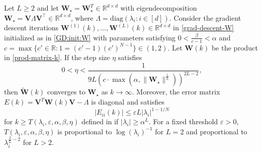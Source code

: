 \documentclass{svproc}
\newcommand{\bV}{\boldsymbol{V}}
\newcommand{\bW}{\boldsymbol{W}}
\newcommand{\0}{\boldsymbol{0}}
\newcommand{\1}{\boldsymbol{1}}
\renewcommand{\tilde}{\widetilde}
\renewcommand{\epsilon}{\varepsilon}
\def\R{\mathbb{R}}
\def\Lln{\mathcal{L}_\text{ln}}
\def\Wstar{\bW_\star}
\def\tdisc{{k}}
\def\bWprod{\tilde{\bW}}
\newcommand{\diag}{\mathrm{diag}}
\begin{document}
\begin{theorem}\label{theorem:PerturbedInitialization_NonAsymptoticConvergence}
Let $L\geq 2$ and let $\Wstar= \Wstar^T \in \R^{d \times d}$ with eigendecomposition $\Wstar = \bV\Lambda \bV^\top \in \mathbb{R}^{d \times d}$, %
where $\Lambda = \diag(\lambda_i : i \in [d])$. Consider the gradient descent iterations $\bW^{(1)}(\tdisc), \hdots, \bW^{(L)}(\tdisc) \in \mathbb{R}^{d\times d}$ in \eqref{grad-descent-W} 
initialized as in \eqref{GD:init:W} with 
parameters satisfying $0 < \frac{\beta}{c-1} < \alpha $ and $c=\max\{c'\in\mathbb{R}:1=(c'-1)(c')^{N-1}\}\in(1,2)$. Let $\bW(\tdisc)$ be the product in \eqref{prod-matrix-k}.
If the step size $\eta$ satisfies
\begin{equation}\label{cond:stepsize:thm}
    0 < \eta < 
    \frac{1}{9L (c\cdot\max(\alpha,\|\Wstar\|^{\frac{1}{L}}))^{2L-2}},
\end{equation}
then $\bWprod(\tdisc)$ converges to $\Wstar$ as $\tdisc \to \infty$. Moreover, the error matrix $E(\tdisc) = \bV^T \bW(\tdisc) \bV - \Lambda$ is diagonal and satisfies
\[
|E_{ii}(\tdisc)| \leq \varepsilon L |\lambda_{i}|^{1-1/N}
\]
for $\tdisc \geq T(\lambda_i,\epsilon,\alpha,\beta,\eta)$ defined in \cite{chou2024gradient} if $|\lambda_i| \geq \alpha^L$.
For a fixed threshold $\epsilon>0$,
$T(\lambda_i,\epsilon,\alpha,\beta,\eta)$
is proportional to 
$\log(\lambda_i)^{-1}$ for $L=2$ and proportional to $\lambda_i^{\frac{2}{L}-2}$ for $L>2$.
\end{theorem}
\end{document}

